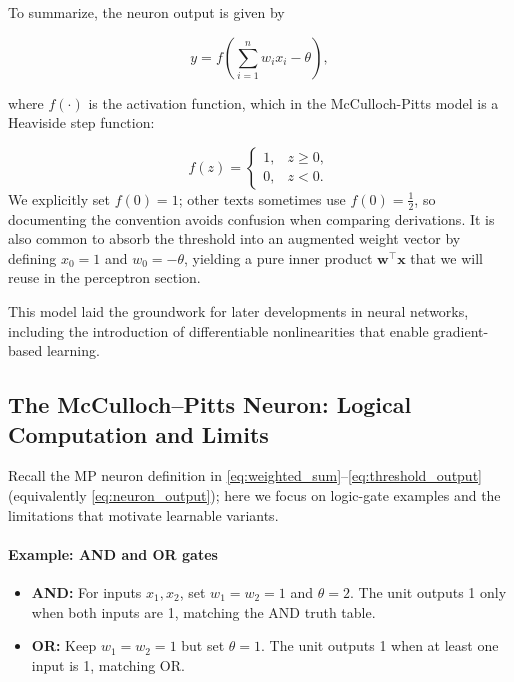 To summarize, the neuron output is given by

\begin{equation}
    y = f\left( \sum_{i=1}^n w_i x_i - \theta \right),
    \label{eq:neuron_output}
\end{equation}

where \( f(\cdot) \) is the activation function, which in the McCulloch-Pitts model is a Heaviside step function:

\[
    f(z) =
    \begin{cases}
        1, & z \geq 0, \\
        0, & z < 0.
    \end{cases}
\]
We explicitly set \(f(0)=1\); other texts sometimes use \(f(0)=\tfrac{1}{2}\), so documenting the convention avoids confusion when comparing derivations. It is also common to absorb the threshold into an augmented weight vector by defining \(x_0 = 1\) and \(w_0 = -\theta\), yielding a pure inner product \(\mathbf{w}^\top \mathbf{x}\) that we will reuse in the perceptron section.

This model laid the groundwork for later developments in neural networks, including the introduction of differentiable nonlinearities that enable gradient-based learning.

\subsection{The McCulloch--Pitts Neuron: Logical Computation and Limits}
\label{sec:perceptron_mcculloch_pitts_neuron_examples_and_limits}

Recall the MP neuron definition in \eqref{eq:weighted_sum}--\eqref{eq:threshold_output} (equivalently \eqref{eq:neuron_output}); here we focus on logic-gate examples and the limitations that motivate learnable variants.

\paragraph{Example: AND and OR gates}

\begin{itemize}
    \item \textbf{AND:} For inputs \(x_1, x_2\), set \(w_1 = w_2 = 1\) and \(\theta = 2\). The unit outputs 1 only when both inputs are 1, matching the AND truth table.
    \item \textbf{OR:} Keep \(w_1 = w_2 = 1\) but set \(\theta = 1\). The unit outputs 1 when at least one input is 1, matching OR.
\end{itemize}

